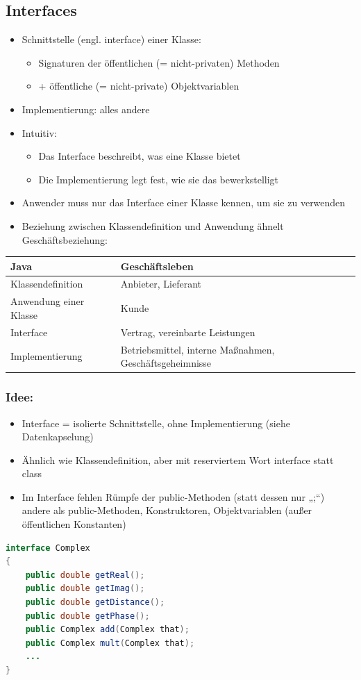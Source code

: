 \subsection{Interfaces}
\begin{itemize}
\item Schnittstelle (engl. interface) einer Klasse:
\begin{itemize}
\item Signaturen der öffentlichen (= nicht-privaten) Methoden
\item + öffentliche (= nicht-private) Objektvariablen
\end{itemize}
\item Implementierung: alles andere
\item Intuitiv:
\begin{itemize}
\item Das Interface beschreibt, was eine Klasse bietet
\item Die Implementierung legt fest, wie sie das bewerkstelligt
\end{itemize}
\item Anwender muss nur das Interface einer Klasse kennen, um sie zu  verwenden
\item Beziehung zwischen Klassendefinition und Anwendung ähnelt Geschäftsbeziehung:
\end{itemize}
\begin{tabular}{ll}
\textbf{Java} & \textbf{Geschäftsleben} \\ \hline
Klassendefinition  & Anbieter, Lieferant \\
Anwendung einer Klasse & Kunde \\
Interface & Vertrag, vereinbarte Leistungen \\
Implementierung & Betriebsmittel, interne Maßnahmen, Geschäftsgeheimnisse \\
\end{tabular}

\subsubsection{Idee:}
\begin{itemize}
\item Interface = isolierte Schnittstelle, ohne Implementierung (siehe Datenkapselung)
\item Ähnlich wie Klassendefinition, aber mit reserviertem Wort interface statt class
\item Im Interface fehlen Rümpfe der public-Methoden (statt dessen nur „;“) andere als public-Methoden, Konstruktoren, Objektvariablen (außer öffentlichen Konstanten)
\end{itemize}
\begin{lstlisting}[language=JAVA]
interface Complex
{
	public double getReal();
	public double getImag();
	public double getDistance();
	public double getPhase();
	public Complex add(Complex that);
	public Complex mult(Complex that);
	...
}
\end{lstlisting}

